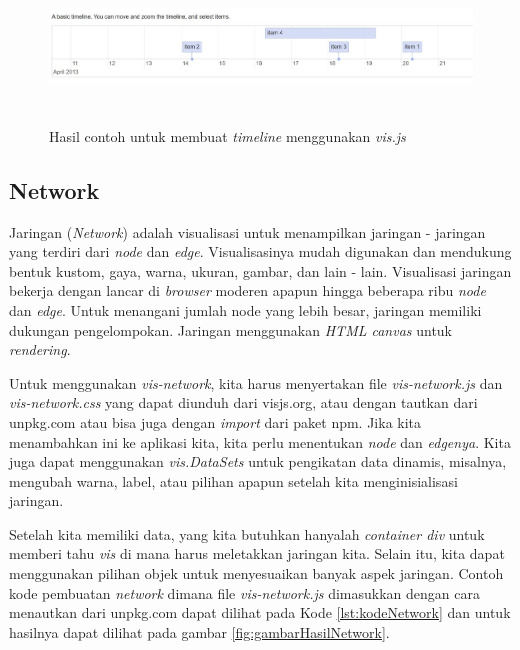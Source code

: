 \begin{figure}[H]
    \centering
    \includegraphics[width=16cm, height=4cm]{Gambar/hasilTimeline.jpg}
    \caption{Hasil contoh untuk membuat \textit{timeline} menggunakan \textit{vis.js}}
    \label{fig:gambarHasilTimeline}
\end{figure}


\subsection{Network}
Jaringan (\textit{Network}) adalah visualisasi untuk menampilkan jaringan - jaringan yang terdiri dari \textit{node} dan \textit{edge}. Visualisasinya mudah digunakan dan mendukung bentuk kustom, gaya, warna, ukuran, gambar, dan lain - lain. Visualisasi jaringan bekerja dengan lancar di \textit{browser} moderen apapun hingga beberapa ribu \textit{node} dan \textit{edge}. Untuk menangani jumlah node yang lebih besar, jaringan memiliki dukungan pengelompokan. Jaringan menggunakan \textit{HTML canvas} untuk \textit{rendering}.

Untuk menggunakan \textit{vis-network}, kita harus menyertakan file \textit{vis-network.js} dan \textit{vis-network.css} yang dapat diunduh dari visjs.org, atau dengan tautkan dari unpkg.com atau bisa juga dengan \textit{import} dari paket npm. Jika kita menambahkan ini ke aplikasi kita, kita perlu menentukan \textit{node} dan \textit{edgenya}. Kita juga dapat menggunakan \textit{vis.DataSets} untuk pengikatan data dinamis, misalnya, mengubah warna, label, atau pilihan apapun setelah kita menginisialisasi jaringan.

Setelah kita memiliki data, yang kita butuhkan hanyalah \textit{container div} untuk memberi tahu \textit{vis} di mana harus meletakkan jaringan kita. Selain itu, kita dapat menggunakan pilihan objek untuk menyesuaikan banyak aspek jaringan. Contoh kode pembuatan \textit{network}  dimana file \textit{vis-network.js} dimasukkan dengan cara menautkan dari unpkg.com dapat dilihat pada Kode \ref{lst:kodeNetwork} dan untuk hasilnya dapat dilihat pada gambar \ref{fig:gambarHasilNetwork}.

